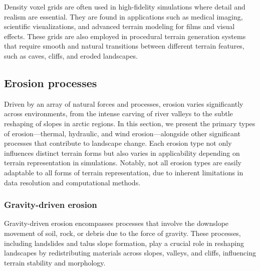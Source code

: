 
Density voxel grids are often used in high-fidelity simulations where detail and realism are essential. They are found in applications such as medical imaging, scientific visualizations, and advanced terrain modeling for films and visual effects. These grids are also employed in procedural terrain generation systems that require smooth and natural transitions between different terrain features, such as caves, cliffs, and eroded landscapes.







\subsection{Erosion processes}
Driven by an array of natural forces and processes, erosion varies significantly across environments, from the intense carving of river valleys to the subtle reshaping of slopes in arctic regions. In this section, we present the primary types of erosion—thermal, hydraulic, and wind erosion—alongside other significant processes that contribute to landscape change. 
Each erosion type not only influences distinct terrain forms but also varies in applicability depending on terrain representation in simulations. Notably, not all erosion types are easily adaptable to all forms of terrain representation, due to inherent limitations in data resolution and computational methods.


\subsubsection{Gravity-driven erosion}

Gravity-driven erosion encompasses processes that involve the downslope movement of soil, rock, or debris due to the force of gravity. These processes, including landslides and talus slope formation, play a crucial role in reshaping landscapes by redistributing materials across slopes, valleys, and cliffs, influencing terrain stability and morphology.


